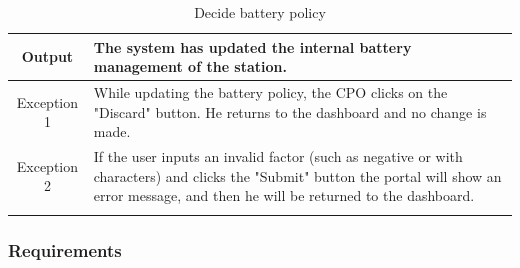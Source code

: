 \begin{longtable}{|c| p{10cm}|}
    \hline
    Output           & The system has updated the internal battery management of the station.
    \\
    \hline
    \hline
    Exception 1      &  While updating the battery policy, the CPO clicks on the "Discard" button. He returns to the dashboard and no change is made. \\
    \hline
    Exception 2     & If the user inputs an invalid factor (such as negative or with characters) and clicks the "Submit" button the portal will show an error message, and then he will be returned to the dashboard.
    \\
    \hline
    \caption{Decide battery policy}\\
\end{longtable}
\subsubsection{Requirements}
